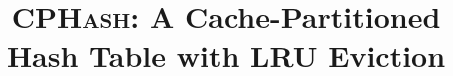 \documentclass[10pt,twocolumn]{article}
\begin{document}
\newcommand{\cphash}{{\scshape CPHash}}
\newcommand{\cpserver}{{\scshape CPServer}}
\newcommand{\lockhash}{{\scshape LockHash}}
\newcommand{\lockserver}{{\scshape LockServer}}
\newcommand{\memcached}{{\scshape Memcached}}

\title{\cphash: A Cache-Partitioned Hash Table with LRU Eviction}
\author{}
\date{}
\maketitle











\end{document}
